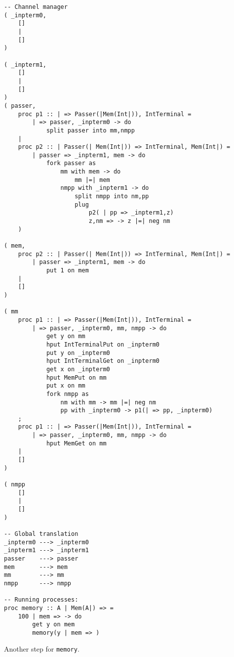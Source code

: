 \documentclass{article}
\theoremstyle{plain}%
\theoremstyle{definition}
\theoremstyle{remark}
\begin{document}
\begin{verbatim}
-- Channel manager
( _inpterm0,  
    []
    |
    []
)

( _inpterm1,  
    []
    |
    []
)
( passer,
    proc p1 :: | => Passer(|Mem(Int|)), IntTerminal = 
        | => passer, _inpterm0 -> do
            split passer into mm,nmpp 
    |
    proc p2 :: | Passer(| Mem(Int|)) => IntTerminal, Mem(Int|) =
        | passer => _inpterm1, mem -> do
            fork passer as
                mm with mem -> do
                    mm |=| mem
                nmpp with _inpterm1 -> do
                    split nmpp into nm,pp
                    plug
                        p2( | pp => _inpterm1,z)
                        z,nm => -> z |=| neg nm
    )

( mem,
    proc p2 :: | Passer(| Mem(Int|)) => IntTerminal, Mem(Int|) =
        | passer => _inpterm1, mem -> do
            put 1 on mem
    |
    []
)

( mm
    proc p1 :: | => Passer(|Mem(Int|)), IntTerminal = 
        | => passer, _inpterm0, mm, nmpp -> do
            get y on mm
            hput IntTerminalPut on _inpterm0
            put y on _inpterm0
            hput IntTerminalGet on _inpterm0
            get x on _inpterm0
            hput MemPut on mm
            put x on mm
            fork nmpp as
                nm with mm -> mm |=| neg nm 
                pp with _inpterm0 -> p1(| => pp, _inpterm0)
    ;
    proc p1 :: | => Passer(|Mem(Int|)), IntTerminal = 
        | => passer, _inpterm0, mm, nmpp -> do
            hput MemGet on mm 
    |
    []
)

( nmpp
    []
    |
    []
)

-- Global translation
_inpterm0 ---> _inpterm0 
_inpterm1 ---> _inpterm1 
passer    ---> passer 
mem       ---> mem
mm        ---> mm
nmpp      ---> nmpp

-- Running processes:
proc memory :: A | Mem(A|) => =
    100 | mem => -> do
        get y on mem
        memory(y | mem => )
\end{verbatim}

Another step for \verb|memory|.
\end{document}
